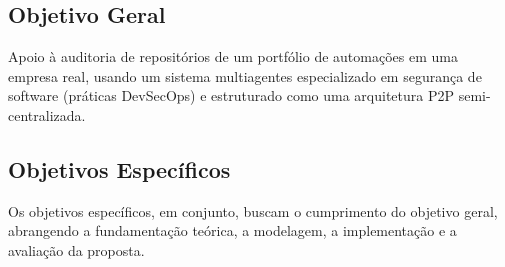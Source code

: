 \subsection{Objetivo Geral}
\label{1-objetivos-gerais}

Apoio à auditoria de repositórios de um portfólio de automações em uma empresa real, usando um sistema multiagentes especializado em segurança de software (práticas DevSecOps) e estruturado como uma arquitetura P2P semi-centralizada.

\subsection{Objetivos Específicos}
\label{1-objetivos-especificos}

Os objetivos específicos, em conjunto, buscam o cumprimento do objetivo geral, abrangendo a fundamentação teórica, a modelagem, a implementação e a avaliação da proposta.

